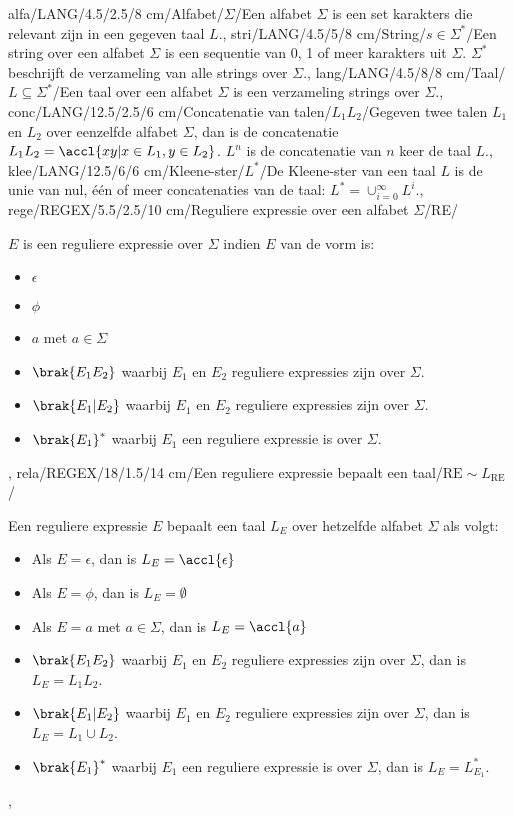 alfa/LANG/4.5/2.5/8 cm/Alfabet/{$\Sigma$}/{Een alfabet $\Sigma$ is een set karakters die relevant zijn in een gegeven taal $L$.},
stri/LANG/4.5/5/8 cm/String/{$s\in\Sigma^*$}/{Een string over een alfabet $\Sigma$ is een sequentie van 0, 1 of meer karakters uit $\Sigma$. $\Sigma^*$ beschrijft de verzameling van alle strings over $\Sigma$.},
lang/LANG/4.5/8/8 cm/Taal/{$L\subseteq\Sigma^*$}/{Een taal over een alfabet $\Sigma$ is een verzameling strings over $\Sigma$.},
conc/LANG/12.5/2.5/6 cm/Concatenatie van talen/{$L_1L_2$}/{Gegeven twee talen $L_1$ en $L_2$ over eenzelfde alfabet $\Sigma$, dan is de concatenatie $L_1L_2=\accl{xy|x\in L_1,y\in L_2}$. $L^n$ is de concatenatie van $n$ keer de taal $L$.},
klee/LANG/12.5/6/6 cm/Kleene-ster/{$L^*$}/{De Kleene-ster van een taal $L$ is de unie van nul, \'e\'en of meer concatenaties van de taal: $L^*=\displaystyle\cup_{i=0}^{\infty}{L^i}$.},
rege/REGEX/5.5/2.5/10 cm/Reguliere expressie over een alfabet $\Sigma$/RE/{$E$ is een reguliere expressie over $\Sigma$ indien $E$ van de vorm is:\begin{itemize}
 \item $\epsilon$
 \item $\phi$
 \item $a$ met $a\in\Sigma$
 \item $\brak{E_1E_2}$ waarbij $E_1$ en $E_2$ reguliere expressies zijn over $\Sigma$.
 \item $\brak{E_1|E_2}$ waarbij $E_1$ en $E_2$ reguliere expressies zijn over $\Sigma$.
 \item $\brak{E_1}^*$ waarbij $E_1$ een reguliere expressie is over $\Sigma$.
\end{itemize}},
rela/REGEX/18/1.5/14 cm/Een reguliere expressie bepaalt een taal/$\mbox{RE}\sim L_{\mbox{RE}}$/{Een reguliere expressie $E$ bepaalt een taal $L_E$ over hetzelfde alfabet $\Sigma$ als volgt:\begin{itemize}
 \item Als $E=\epsilon$, dan is $L_E=\accl{\epsilon}$
 \item Als $E=\phi$, dan is $L_E=\emptyset$
 \item Als $E=a$ met $a\in\Sigma$, dan is $L_E=\accl{a}$
 \item $\brak{E_1E_2}$ waarbij $E_1$ en $E_2$ reguliere expressies zijn over $\Sigma$, dan is $L_E=L_1L_2$.
 \item $\brak{E_1|E_2}$ waarbij $E_1$ en $E_2$ reguliere expressies zijn over $\Sigma$, dan is $L_E=L_1\cup L_2$.
 \item $\brak{E_1}^*$ waarbij $E_1$ een reguliere expressie is over $\Sigma$, dan is $L_E=L_{E_1}^*$.
\end{itemize}},
